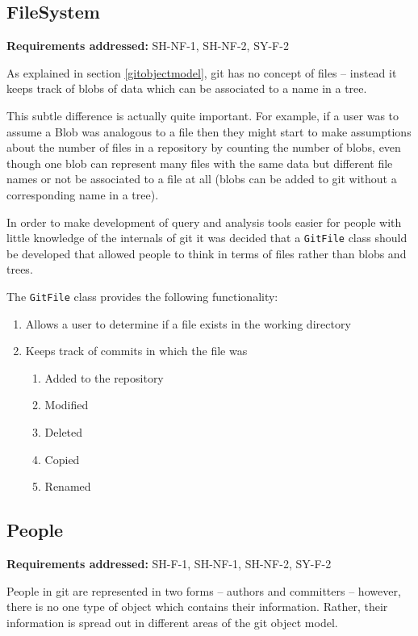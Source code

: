 \documentclass[11pt]{book}
\newcommand{\code}[1]{\texttt{#1}}
\begin{document}
\subsection{FileSystem}
\begin{tcolorbox}
\textbf{Requirements addressed:} SH-NF-1, SH-NF-2, SY-F-2
\end{tcolorbox}
As explained in section \ref{gitobjectmodel}, git has no concept of files -- instead it keeps track of blobs of data which can be associated to a name in a tree.

This subtle difference is actually quite important. For example, if a user was to assume a Blob was analogous to a file then they might start to make assumptions about the number of files in a repository by counting the number of blobs, even though one blob can represent many files with the same data but different file names or not be associated to a file at all (blobs can be added to git without a corresponding name in a tree).

In order to make development of query and analysis tools easier for people with little knowledge of the internals of git it was decided that a \code{GitFile} class should be developed that allowed people to think in terms of files rather than blobs and trees. 

The \code{GitFile} class provides the following functionality:

\begin{enumerate}
	\item Allows a user to determine if a file exists in the working directory
	\item Keeps track of commits in which the file was 
	\begin{enumerate}
	\item Added to the repository
	\item Modified
	\item Deleted
	\item Copied
	\item Renamed
	\end{enumerate}
\end{enumerate}

\subsection{People}
\begin{tcolorbox}
\textbf{Requirements addressed:} SH-F-1, SH-NF-1, SH-NF-2, SY-F-2
\end{tcolorbox}
People in git are represented in two forms -- authors and committers -- however, there is no one type of object which contains their information. Rather, their information is spread out in different areas of the git object model. 
\end{document}
